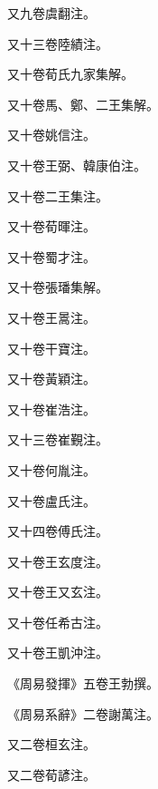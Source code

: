 \begin{pinyinscope}
 又九卷虞翻注。



 又十三卷陸績注。



 又十卷荀氏九家集解。



 又十卷馬、鄭、二王集解。



 又十卷姚信注。



 又十卷王弼、韓康伯注。



 又十卷二王集注。



 又十卷荀暉注。



 又十卷蜀才注。



 又十卷張璠集解。



 又十卷王暠注。



 又十卷干寶注。



 又十卷黃穎注。



 又十卷崔浩注。



 又十三卷崔覲注。



 又十卷何胤注。



 又十卷盧氏注。



 又十四卷傅氏注。



 又十卷王玄度注。



 又十卷王又玄注。



 又十卷任希古注。



 又十卷王凱沖注。



 《周易發揮》五卷王勃撰。



 《周易系辭》二卷謝萬注。



 又二卷桓玄注。



 又二卷荀諺注。




\end{pinyinscope}
